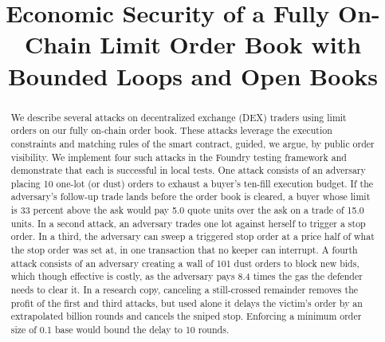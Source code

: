 \documentclass[conference]{IEEEtran}
\begin{document}
\title{Economic Security of a Fully On-Chain Limit Order Book with Bounded Loops and Open Books}

\author{
\and
{}
}

\maketitle

\begin{abstract}
We describe several attacks on decentralized exchange (DEX) traders using limit orders on our fully on-chain order book. %
These attacks leverage the execution constraints and matching rules of the smart contract, guided, we argue, by public order visibility. We implement four such attacks in the Foundry testing framework and demonstrate that each is successful in local tests. %
One attack consists of an adversary placing 10 one-lot (or dust) orders to exhaust a buyer's ten-fill execution budget. If the adversary's follow-up trade lands before the order book is cleared, a buyer whose limit is 33 percent above the ask would pay 5.0 quote units over the ask on a trade of 15.0 units. %
In a second attack, an adversary trades one lot against herself to trigger a stop order. In a third, the adversary can sweep a triggered stop order at a price half of what the stop order was set at, in one transaction that no keeper can interrupt. %
A fourth attack consists of an adversary creating a wall of 101 dust orders to block new bids, which though effective is costly, as the adversary pays 8.4 times the gas the defender needs to clear it. %
In a research copy, canceling a still-crossed remainder removes the profit of the first and third attacks, but used alone it delays the victim's order by an extrapolated billion rounds and cancels the sniped stop. Enforcing a minimum order size of 0.1 base would bound the delay to 10 rounds. %
\end{abstract}
\end{document}
